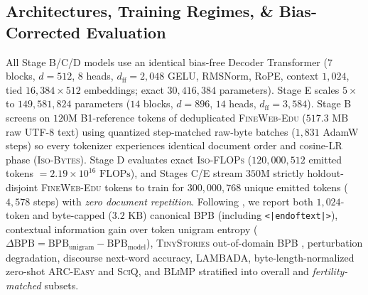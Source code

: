 \documentclass[11pt,a4paper]{article}
\begin{document}
\subsection{Architectures, Training Regimes, \& Bias-Corrected Evaluation}
All Stage B/C/D models use an identical bias-free Decoder Transformer ($7$ blocks, $d=512$, $8$ heads, $d_{\text{ff}}=2{,}048$ GELU, RMSNorm, RoPE, context $1{,}024$, tied $16{,}384 \times 512$ embeddings; exact $30{,}416{,}384$ parameters). Stage E scales $5\times$ to $149{,}581{,}824$ parameters ($14$ blocks, $d=896$, $14$ heads, $d_{\text{ff}}=3{,}584$). Stage B screens on $120\text{M}$ \textsc{B1}-reference tokens of deduplicated \textsc{FineWeb-Edu} ($517.3\text{ MB}$ raw UTF-8 text) using quantized step-matched raw-byte batches ($1{,}831$ AdamW steps) so every tokenizer experiences identical document order and cosine-LR phase (\textsc{Iso-Bytes}). Stage D evaluates exact \textsc{Iso-FLOPs} ($120{,}000{,}512$ emitted tokens $= 2.19 \times 10^{16}\text{ FLOPs}$), and Stages C/E stream $350\text{M}$ strictly holdout-disjoint \textsc{FineWeb-Edu} tokens to train for $300{,}000{,}768$ unique emitted tokens ($4{,}578$ steps) with \emph{zero document repetition}. Following \citet{schaeffer2026myths}, we report both $1{,}024$-token and byte-capped ($3.2\text{ KB}$) canonical BPB (including \texttt{<|endoftext|>}), contextual information gain over token unigram entropy ($\Delta\text{BPB} = \text{BPB}_{\text{unigram}} - \text{BPB}_{\text{model}}$), \textsc{TinyStories} out-of-domain BPB \citep{eldan2023tinystories}, perturbation degradation, discourse next-word accuracy, \textsc{LAMBADA}, byte-length-normalized zero-shot \textsc{ARC-Easy} and \textsc{SciQ}, and \textsc{BLiMP} stratified into overall and \emph{fertility-matched} subsets.
\end{document}
